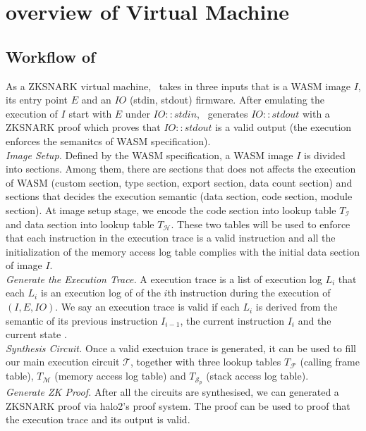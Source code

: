 \section{overview of \zkwasm Virtual Machine}
\subsection{Workflow of \zkwasm}
As a ZKSNARK virtual machine, \zkwasm\, takes in three inputs that is a WASM image $I$, its entry point $E$ and an $IO$ (stdin, stdout) firmware. After emulating the execution of $I$ start with $E$ under $IO::stdin$, \zkwasm\, generates $IO::stdout$ with a ZKSNARK proof which proves that $IO::stdout$ is a valid output (the execution enforces the semanitcs of WASM specification).\\

\noindent\emph{Image Setup.}
Defined by the WASM specification, a WASM image $I$ is divided into sections. Among them, there are sections that does not affects the execution of WASM (custom section, type section, export section, data count section) and sections that decides the execution semantic (data section, code section, module section). At image setup stage, we encode the code section into lookup table $T_\mathcal{I}$ and data section into lookup table $T_\mathcal{H}$. These two tables will be used to enforce that each instruction in the execution trace is a valid instruction and all the initialization of the memory access log table complies with the initial data section of image $I$.\\

\noindent\emph{Generate the Execution Trace.}
A execution trace is a list of execution log $L_i$ that each $L_i$ is an execution log of of the $i$th instruction during the execution of $(I, E, IO)$. We say an execution trace is valid if each $L_i$ is derived from the semantic of its previous instruction $I_{i-1}$, the current instruction $I_{i}$ and the current state \fullstate.\\

\noindent\emph{Synthesis Circuit.}
Once a valid exectuion trace is generated, it can be used to fill our main execution circuit $\mathcal{T}$, together with three lookup tables $T_\mathcal{F}$ (calling frame table), $T_\mathcal{M}$ (memory access log table) and $T_{\mathcal{S}_p}$ (stack access log table). \\

\noindent\emph{Generate ZK Proof.}
After all the circuits are synthesised, we can generated a ZKSNARK proof via halo2's proof system. The proof can be used to proof that the execution trace and its output is valid.

